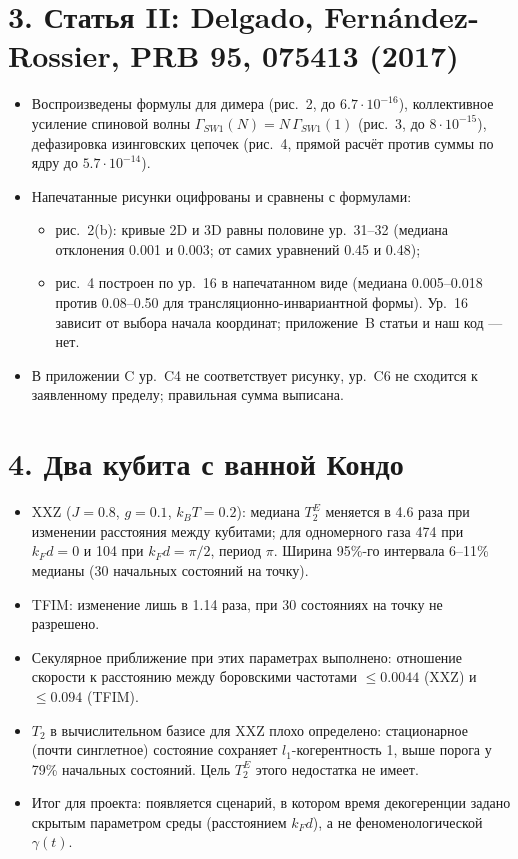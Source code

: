 \documentclass[11pt,a4paper]{article}
\begin{document}
\section*{3. Статья II: Delgado, Fern\'andez-Rossier, PRB 95, 075413 (2017)}
\begin{itemize}
\item Воспроизведены формулы для димера (рис.~2, до $6.7\cdot10^{-16}$),
  коллективное усиление спиновой волны $\Gamma_{SW1}(N)=N\,\Gamma_{SW1}(1)$
  (рис.~3, до $8\cdot10^{-15}$), дефазировка изинговских цепочек (рис.~4,
  прямой расчёт против суммы по ядру до $5.7\cdot10^{-14}$).
\item Напечатанные рисунки оцифрованы и сравнены с формулами:
  \begin{itemize}
  \item рис.~2(b): кривые 2D и 3D равны половине ур.~31--32 (медиана
    отклонения 0.001 и 0.003; от самих уравнений 0.45 и 0.48);
  \item рис.~4 построен по ур.~16 в напечатанном виде (медиана 0.005--0.018
    против 0.08--0.50 для трансляционно-инвариантной формы). Ур.~16 зависит
    от выбора начала координат; приложение~B статьи и наш код --- нет.
  \end{itemize}
\item В приложении C ур.~C4 не соответствует рисунку, ур.~C6 не сходится к
  заявленному пределу; правильная сумма выписана.
\end{itemize}

\section*{4. Два кубита с ванной Кондо}
\begin{itemize}
\item XXZ ($J=0.8$, $g=0.1$, $k_BT=0.2$): медиана $T_2^E$ меняется в 4.6 раза
  при изменении расстояния между кубитами; для одномерного газа 474 при
  $k_Fd=0$ и 104 при $k_Fd=\pi/2$, период $\pi$. Ширина 95\%-го интервала
  6--11\% медианы (30 начальных состояний на точку).
\item TFIM: изменение лишь в 1.14 раза, при 30 состояниях на точку не
  разрешено.
\item Секулярное приближение при этих параметрах выполнено: отношение
  скорости к расстоянию между боровскими частотами $\le0.0044$ (XXZ) и
  $\le0.094$ (TFIM).
\item $T_2$ в вычислительном базисе для XXZ плохо определено: стационарное
  (почти синглетное) состояние сохраняет $l_1$-когерентность 1, выше порога
  у 79\% начальных состояний. Цель $T_2^E$ этого недостатка не имеет.
\item Итог для проекта: появляется сценарий, в котором время декогеренции
  задано скрытым параметром среды (расстоянием $k_Fd$), а не
  феноменологической $\gamma(t)$.
\end{itemize}
\end{document}
